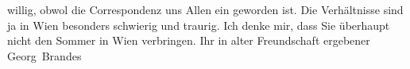 \begin{ledgroupsized}[t]{13cm}
               willig, obwol {\pb}die Correspondenz
               uns Allen ein \label{K_L02354_1v}\label{K_L02354_1h} geworden
               ist.\pend
           \pstart
           Die Verhältnisse sind ja in Wien besonders schwierig
               und traurig. Ich denke mir, dass Sie überhaupt nicht den Sommer in Wien verbringen.\pend
           \pstart Ihr in alter Freundschaft ergebener \spacefill\mbox{Georg Brandes}\pend{}\endnumbering{}\end{ledgroupsized}  \newcommand{\dateiname}{L02354}\newcommand{\titel}{Georg Brandes an Arthur Schnitzler, 17. 8. 1920}\newcommand{\editorInnen}{Martin Anton Müller und Gerd-Hermann Susen}
      